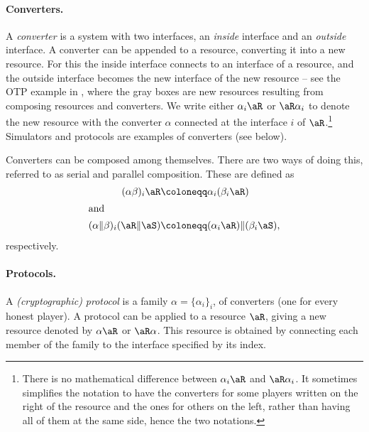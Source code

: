 \paragraph{Converters.} A \emph{converter} is a system with two
interfaces, an \emph{inside} interface and an \emph{outside}
interface. A converter can be appended to a resource, converting it
into a new resource. For this the inside interface connects to an
interface of a resource, and the outside interface becomes the new
interface of the new resource \--- see the OTP example in
, where the gray boxes are new resources resulting
from composing resources and converters. We write either
$\alpha_i \aR$ or $\aR\alpha_i$ to denote the new resource with the
converter $\alpha$ connected at the interface $i$ of
$\aR$.\footnote{There is no mathematical difference between
  $\alpha_i \aR$ and $\aR\alpha_i$. It sometimes simplifies the
  notation to have the converters for some players written on the
  right of the resource and the ones for others on the left, rather
  than having all of them at the same side, hence the two notations.}
Simulators and protocols are examples of converters (see below).

Converters can be composed among themselves. There are two ways of
doing this, referred to as serial and parallel composition. These are
defined as
\begin{align*} %
(\alpha\beta)_i \aR & \coloneqq
  \alpha_i (\beta_i \aR) \\ \intertext{and}  (\alpha \| \beta)_i
  (\aR\|\aS) & \coloneqq (\alpha_i \aR) \| (\beta_i \aS), \end{align*}
  respectively. 
  
  \paragraph{Protocols.} A \emph{(cryptographic) protocol} is a family
  $\alpha = \{\alpha_i\}_i$, of converters (one for every honest
  player). A protocol can be applied to a resource $\aR$, giving a new
  resource denoted by $\alpha\aR$ or $\aR\alpha$. This resource is
  obtained by connecting each member of the family to the interface
  specified by its index.


